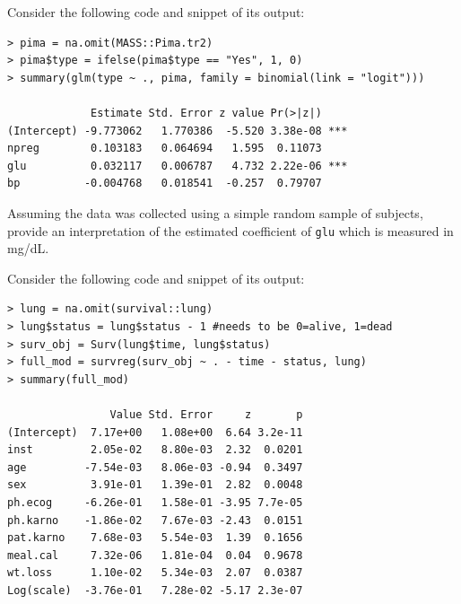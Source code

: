 \documentclass[12pt]{article}
\begin{document}
\begin{enumerate}[(a)]

 Consider the following code and snippet of its output:

\begin{Verbatim}[frame=single]
> pima = na.omit(MASS::Pima.tr2)
> pima$type = ifelse(pima$type == "Yes", 1, 0)
> summary(glm(type ~ ., pima, family = binomial(link = "logit")))

             Estimate Std. Error z value Pr(>|z|)    
(Intercept) -9.773062   1.770386  -5.520 3.38e-08 ***
npreg        0.103183   0.064694   1.595  0.11073    
glu          0.032117   0.006787   4.732 2.22e-06 ***
bp          -0.004768   0.018541  -0.257  0.79707    
\end{Verbatim}

Assuming the data was collected using a simple random sample of subjects, provide an interpretation of the estimated coefficient of \texttt{glu} which is measured in mg/dL.

\iftoggle{solutions}{\inred{
When comparing two subjects (A) and (B) which are sampled in the same fashion as the other subjects in this dataset where (A) has a \texttt{glu} measurement 1mg/dL larger than (B)'s \texttt{glu} measurement but share the same other observed measurements otherwise, then (A) is predicted to have an estimated log odds probability of diabetes 0.032 $\pm$ 0.007 higher than (B)'s log odds probability of diabetes assuming the log odds probability of diabetes is linear in the measurements considered herein.
}}{~\spc{3}}
\pagebreak

 Consider the following code and snippet of its output:

\begin{Verbatim}[frame=single]
> lung = na.omit(survival::lung)
> lung$status = lung$status - 1 #needs to be 0=alive, 1=dead
> surv_obj = Surv(lung$time, lung$status)
> full_mod = survreg(surv_obj ~ . - time - status, lung)
> summary(full_mod)

                Value Std. Error     z       p
(Intercept)  7.17e+00   1.08e+00  6.64 3.2e-11
inst         2.05e-02   8.80e-03  2.32  0.0201
age         -7.54e-03   8.06e-03 -0.94  0.3497
sex          3.91e-01   1.39e-01  2.82  0.0048
ph.ecog     -6.26e-01   1.58e-01 -3.95 7.7e-05
ph.karno    -1.86e-02   7.67e-03 -2.43  0.0151
pat.karno    7.68e-03   5.54e-03  1.39  0.1656
meal.cal     7.32e-06   1.81e-04  0.04  0.9678
wt.loss      1.10e-02   5.34e-03  2.07  0.0387
Log(scale)  -3.76e-01   7.28e-02 -5.17 2.3e-07


\end{Verbatim}
\end{enumerate}
\end{document}
